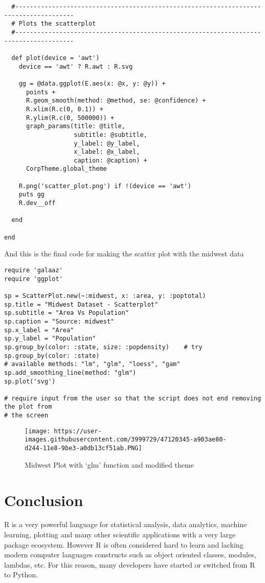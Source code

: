 \documentclass[]{article}
\begin{document}
\begin{verbatim}
  #--------------------------------------------------------------------------------------
  # Plots the scatterplot
  #--------------------------------------------------------------------------------------

  def plot(device = 'awt')
    device == 'awt' ? R.awt : R.svg
   
    gg = @data.ggplot(E.aes(x: @x, y: @y)) +
      points + 
      R.geom_smooth(method: @method, se: @confidence) +
      R.xlim(R.c(0, 0.1)) +
      R.ylim(R.c(0, 500000)) + 
      graph_params(title: @title,
                   subtitle: @subtitle, 
                   y_label: @y_label, 
                   x_label: @x_label, 
                   caption: @caption) +
      CorpTheme.global_theme

    R.png('scatter_plot.png') if !(device == 'awt')
    puts gg
    R.dev__off
    
  end
  
end
\end{verbatim}

And this is the final code for making the scatter plot with the midwest
data

\begin{verbatim}
require 'galaaz'
require 'ggplot'

sp = ScatterPlot.new(~:midwest, x: :area, y: :poptotal)
sp.title = "Midwest Dataset - Scatterplot"
sp.subtitle = "Area Vs Population"
sp.caption = "Source: midwest"
sp.x_label = "Area"
sp.y_label = "Population"
sp.group_by(color: :state, size: :popdensity)    # try sp.group_by(color: :state)
# available methods: "lm", "glm", "loess", "gam"
sp.add_smoothing_line(method: "glm") 
sp.plot('svg')

# require input from the user so that the script does not end removing the plot from
# the screen
\end{verbatim}

\begin{figure}
\centering
\texttt{[image: https://user-images.githubusercontent.com/3999729/47120345-a903ae80-d244-11e8-9be3-a0db13cf51ab.PNG]}
\caption{Midwest Plot with `glm' function and modified theme}
\end{figure}

\section{Conclusion}\label{conclusion}

R is a very powerful language for statistical analysis, data analytics,
machine learning, plotting and many other scientific applications with a
very large package ecosystem. However R is often considered hard to
learn and lacking modern computer languages constructs such as object
oriented classes, modules, lambdas, etc. For this reason, many
developers have started or switched from R to Python.
\end{document}
